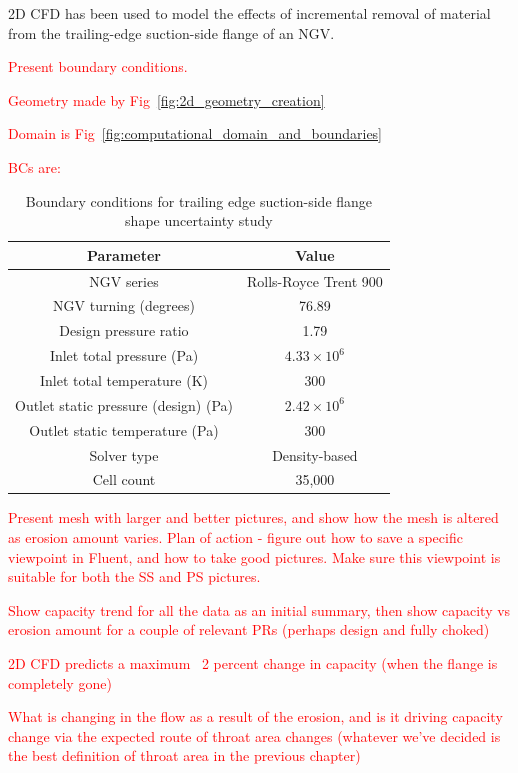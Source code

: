\documentclass[a4paper, 11pt, twoside]{report}
\begin{document}
2D CFD has been used to model the effects of incremental removal of material from the trailing-edge suction-side flange of an NGV. 

\textcolor{red}{Present boundary conditions.}

\textcolor{red}{Geometry made by Fig~\ref{fig:2d_geometry_creation}}

\textcolor{red}{Domain is Fig~\ref{fig:computational_domain_and_boundaries}}

\textcolor{red}{BCs are:}

\begin{table}[H]
\caption{Boundary conditions for trailing edge suction-side flange shape uncertainty study}
\label{ss_cutbacks_parameters}
\begin{center}
\begin{tabular}{|c|c|}
\hline
Parameter & Value\\
\hline
NGV series & Rolls-Royce Trent 900\\
NGV turning (degrees) & 76.89\\
Design pressure ratio & 1.79\\
Inlet total pressure (Pa) & $4.33 \times 10^6$\\
Inlet total temperature (K) & 300\\
Outlet static pressure (design) (Pa) & $2.42 \times 10^6$\\
Outlet static temperature (Pa) & 300\\
Solver type & Density-based\\
Cell count & 35,000\\
\hline
\end{tabular}
\end{center}
\end{table}

\textcolor{red}{Present mesh with larger and better pictures, and show how the mesh is altered as erosion amount varies.}
	\textcolor{red}{Plan of action - figure out how to save a specific viewpoint in Fluent, and how to take good pictures. Make sure this viewpoint is suitable for both the SS and PS pictures.}

\textcolor{red}{Show capacity trend for all the data as an initial summary, then show capacity vs erosion amount for a couple of relevant PRs (perhaps design and fully choked)}

\textcolor{red}{2D CFD predicts a maximum ~2 percent change in capacity (when the flange is completely gone)}

\textcolor{red}{What is changing in the flow as a result of the erosion, and is it driving capacity change via the expected route of throat area changes (whatever we've decided is the best definition of throat area in the previous chapter)}
\end{document}
